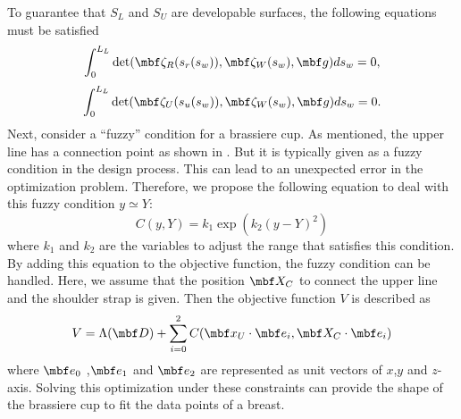 \documentclass[E]{scitrans}
\begin{document}
To guarantee that $ S_L $ and $ S_U $  are developable surfaces, the following equations must be satisfied 
\begin{equation}\label{eq:conds_DevSur1}
	\int_{0}^{L_L} \det (\zetavec_R(s_r(s_w)), \zetavec_W(s_w), \mbold{g}) ds_w = 0,
\end{equation}
\begin{equation}\label{eq:conds_DevSur2}
	\int_{0}^{L_L} \det (\zetavec_U(s_u(s_w)), \zetavec_W(s_w), \mbold{g}) ds_w = 0.
\end{equation}
Next, consider a “fuzzy” condition for a brassiere cup. As mentioned, the upper line has a connection point as shown in . But it is typically given as a fuzzy condition in the design process. This can lead to an unexpected error in the optimization problem. Therefore, we propose the following equation to deal with this fuzzy condition $ y \simeq Y $:
\begin{equation}\label{eq:FuzzyEq}
C(y,Y) = k_1 \exp( k_2(y-Y)^2 )
\end{equation}
where $ k_1 $ and $ k_2 $ are the variables to adjust the range that satisfies this condition. By adding this equation to the objective function, the fuzzy condition can be handled. Here, we assume that the position $ \mbold{X}_C $ to connect the upper line and the shoulder strap is given. Then the objective function $ V $ is described as
\begin{equation}\label{eq:ObjectFunc}
V = \Lambda(\mbold{D}) + \sum_{i=0}^{2} C(\mbold{x}_U \cdot \mbold{e}_i , \mbold{X}_C \cdot \mbold{e}_i)
\end{equation}
where $\mbold{e}_0 $ ,$\mbold{e}_1 $ and $\mbold{e}_2 $ are represented as unit vectors of $ x $,$ y $ and $ z $-axis. Solving this optimization under these constraints can provide the shape of the brassiere cup to fit the data points of a breast.
\end{document}
